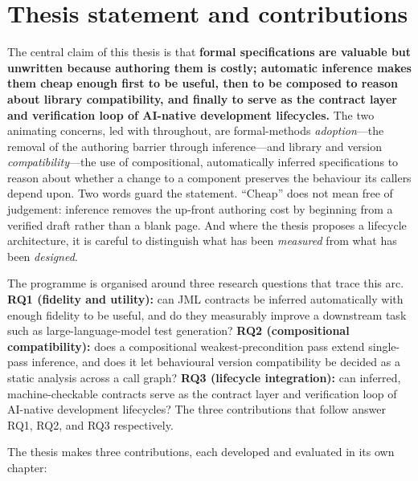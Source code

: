 \section{Thesis statement and contributions}

The central claim of this thesis is that \textbf{formal specifications are valuable
but unwritten because authoring them is costly; automatic inference makes them
cheap enough first to be useful, then to be composed to reason about library
compatibility, and finally to serve as the contract layer and verification loop of
AI-native development lifecycles.} The two animating concerns, led with throughout,
are formal-methods \emph{adoption}---the removal of the authoring barrier through
inference---and library and version \emph{compatibility}---the use of
compositional, automatically inferred specifications to reason about whether a
change to a component preserves the behaviour its callers depend upon. Two words
guard the statement. ``Cheap'' does not mean free of judgement: inference removes
the up-front authoring cost by beginning from a verified draft rather than a blank
page. And where the thesis proposes a lifecycle architecture, it is careful to
distinguish what has been \emph{measured} from what has been \emph{designed}.

The programme is organised around three research questions that trace this arc.
\textbf{RQ1 (fidelity and utility):} can JML contracts be inferred automatically
with enough fidelity to be useful, and do they measurably improve a downstream task
such as large-language-model test generation? \textbf{RQ2 (compositional
compatibility):} does a compositional weakest-precondition pass extend single-pass
inference, and does it let behavioural version compatibility be decided as a static
analysis across a call graph? \textbf{RQ3 (lifecycle integration):} can inferred,
machine-checkable contracts serve as the contract layer and verification loop of
AI-native development lifecycles? The three contributions that follow answer RQ1,
RQ2, and RQ3 respectively.

The thesis makes three contributions, each developed and evaluated in its own
chapter:

